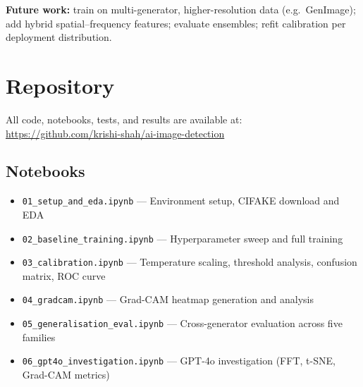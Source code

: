 \documentclass[12pt,a4paper]{article}
\begin{document}
\noindent\textbf{Future work:} train on multi-generator, higher-resolution data (e.g.\ GenImage); add hybrid spatial--frequency features; evaluate ensembles; refit calibration per deployment distribution.

\section{Repository}

All code, notebooks, tests, and results are available at:\\
\url{https://github.com/krishi-shah/ai-image-detection}

\subsection*{Notebooks}
\begin{itemize}[noitemsep]
    \item \texttt{01\_setup\_and\_eda.ipynb} --- Environment setup, CIFAKE download and EDA
    \item \texttt{02\_baseline\_training.ipynb} --- Hyperparameter sweep and full training
    \item \texttt{03\_calibration.ipynb} --- Temperature scaling, threshold analysis, confusion matrix, ROC curve
    \item \texttt{04\_gradcam.ipynb} --- Grad-CAM heatmap generation and analysis
    \item \texttt{05\_generalisation\_eval.ipynb} --- Cross-generator evaluation across five families
    \item \texttt{06\_gpt4o\_investigation.ipynb} --- GPT-4o investigation (FFT, t-SNE, Grad-CAM metrics)
\end{itemize}
\end{document}
